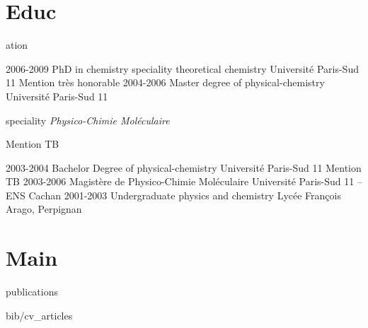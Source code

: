 \documentclass{cv-style}     %
\begin{document}
\vspace{-5mm}
\section{Educ}{ation}
\vspace{-0.2cm}

\begin{entrylist}
\entry
{2006-2009}
{PhD in chemistry {\normalfont speciality theoretical chemistry}}
{Université Paris-Sud 11}
{Mention très honorable}
\entry
{2004-2006}
{Master degree of physical-chemistry}
{Université Paris-Sud 11}
{{\normalfont speciality \textit{Physico-Chimie Moléculaire}}\par Mention TB}
\entry
{2003-2004}
{Bachelor Degree of physical-chemistry}
{Université Paris-Sud 11}
{Mention TB}
\entry
{2003-2006}
{Magistère de Physico-Chimie Moléculaire}
{Université Paris-Sud 11 -- ENS Cachan}
{\vspace{-4mm}}
\entry
{2001-2003}
{Undergraduate {\normalfont physics and chemistry}}
{Lycée François Arago, Perpignan}
{}
\end{entrylist}

\vspace{-6mm}
\section{Main}{ publications}
\vspace{-0.2cm}
\nocite{munoz2019, santos2018, aqturin2017_2, santos2017, vallverdu2016, Maillet2011, Vallverdu2010}
\begin{btSect}{bib/cv_articles}
    \setlength{\bibsep}{2pt}
    \btPrintCited
\end{btSect}

\end{document}
